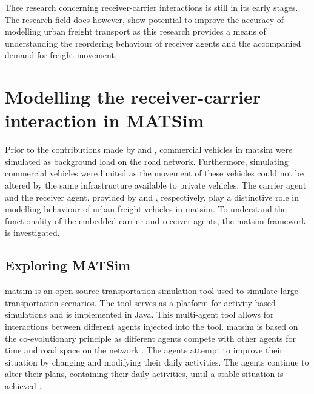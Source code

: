 Thee research concerning receiver-carrier interactions is still in its early stages. The research field does however, show potential to improve the accuracy of modelling urban freight transport as this research provides a means of understanding the reordering behaviour of receiver agents and the accompanied demand for freight movement. \par



\section{Modelling the receiver-carrier interaction in MATSim}
Prior to the contributions made by \citet{schroeder2012towards} and \citet{bean2020behavioural}, commercial vehicles in \acrshort{matsim} were simulated as background load on the road network. Furthermore, simulating commercial vehicles were limited as the movement of these vehicles could not be altered by the same infrastructure available to private vehicles. The carrier agent and the receiver agent, provided by \citet{schroeder2012towards} and \citet{bean2020behavioural}, respectively,  play a distinctive role in modelling behaviour of urban freight vehicles in \acrshort{matsim}. To understand the functionality of the embedded carrier and receiver agents, the \acrshort{matsim} framework is investigated.


\subsection{Exploring MATSim}
\acrshort{matsim} is an open-source transportation simulation tool used to simulate large transportation scenarios. The tool serves as a platform for activity-based simulations and is implemented in Java. This multi-agent tool allows for interactions between different agents injected into the tool. \acrshort{matsim} is based on the co-evolutionary principle as different agents compete with other agents for time and road space on the network \citep{bean2020behavioural}. The agents attempt to improve their situation by changing and modifying their daily activities. The agents continue to alter their plans, containing their daily activities, until a stable situation is achieved \citep{horni2016multi}. \par

